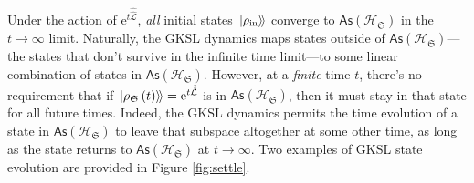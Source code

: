 \documentclass[preprints,article,accept,moreauthors,pdftex]{Definitions/mdpi}
\begin{document}
\begin{paracol}{2}
Under the action of $\mathrm{e}^{t\hat{\hat{\mathcal{L}}}}$, \emph{all} initial states $\left.\ket{\rho_{\mathrm{in}}}\!\right\rangle$ converge to $\mathsf{As}\left(\mathcal{H}_{\mathfrak{S}}\right)$ in the $t\rightarrow\infty$ limit. Naturally, the GKSL dynamics maps states outside of $\mathsf{As}\left(\mathcal{H}_{\mathfrak{S}}\right)$---the states that don't survive in the infinite time limit---to some linear combination of states in $\mathsf{As}\left(\mathcal{H}_{\mathfrak{S}}\right)$. However, at a \emph{finite} time $t$, there's no requirement that if
$\left.\ket{\rho_{\mathfrak{S}}\left(t\right)}\!\right\rangle = \mathrm{e}^{t\hat{\hat{\mathcal{L}}}}$ is in $\mathsf{As}\left(\mathcal{H}_{\mathfrak{S}}\right)$, then it must stay in that state for all future times. Indeed, the GKSL dynamics permits the time evolution of a state in $\mathsf{As}\left(\mathcal{H}_{\mathfrak{S}}\right)$ to leave that subspace altogether at some other time, as long as the state returns to $\mathsf{As}\left(\mathcal{H}_{\mathfrak{S}}\right)$ at $t\rightarrow\infty$. Two examples of GKSL state evolution are provided in Figure \ref{fig:settle}.


\end{paracol}
\end{document}
